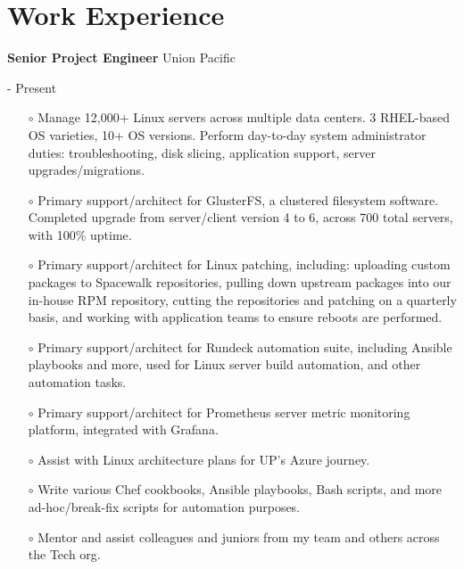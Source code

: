 \documentclass[10pt, a4paper]{article}
\begin{document}
\section*{Work Experience}
\begin{itemize}[leftmargin=0cm]
    \begin{minipage}{0.5\textwidth} %
        \raggedright %
        \item \textbf{Senior Project Engineer} Union Pacific
    \end{minipage}
    \begin{minipage}{0.5\textwidth} %
         \-- Present
    \end{minipage}
    \begin{itemize}[leftmargin=0cm]
        \item[$\circ$] Manage 12,000+ Linux servers across multiple data centers. 3 RHEL-based OS varieties, 10+ OS versions. Perform day-to-day system administrator duties: troubleshooting, disk slicing, application support, server upgrades/migrations.
        \item[$\circ$] Primary support/architect for GlusterFS, a clustered filesystem software. Completed upgrade from server/client version 4 to 6, across 700 total servers, with 100\% uptime.
        \item[$\circ$] Primary support/architect for Linux patching, including: uploading custom packages to Spacewalk repositories, pulling down upstream packages into our in-house RPM repository, cutting the repositories and patching on a quarterly basis, and working with application teams to ensure reboots are performed.
        \item[$\circ$] Primary support/architect for Rundeck automation suite, including Ansible playbooks and more, used for Linux server build automation, and other automation tasks.
        \item[$\circ$] Primary support/architect for Prometheus server metric monitoring platform, integrated with Grafana.
        \item[$\circ$] Assist with Linux architecture plans for UP's Azure journey.
        \item[$\circ$] Write various Chef cookbooks, Ansible playbooks, Bash scripts, and more ad-hoc/break-fix scripts for automation purposes.
        \item[$\circ$] Mentor and assist colleagues and juniors from my team and others across the Tech org.

\end{itemize}
\end{itemize}
\end{document}
